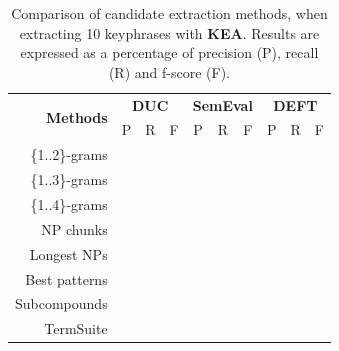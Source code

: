     \begin{table}[h]
      \centering
      \begin{tabular}{rccccccccc}
        \toprule
        \multirow{2}{*}[-2pt]{\textbf{Methods}} & \multicolumn{3}{c}{\textbf{DUC}} & \multicolumn{3}{c}{\textbf{SemEval}} & \multicolumn{3}{c}{\textbf{DEFT}}\\
        \cmidrule(r){2-4}\cmidrule(lr){5-7}\cmidrule(l){8-10}
        & P & R & F & P & R & F & P & R & F\\
        \midrule
        \{1..2\}-grams & & & & & & & & &\\
        \{1..3\}-grams & & & & & & & & &\\
        \{1..4\}-grams & & & & & & & & &\\
        NP chunks & & & & & & & & &\\
        Longest NPs & & & & & & & & &\\
        Best patterns & & & & & & & & &\\
        Subcompounds & & & & & & & & &\\
        TermSuite & & & & & & & & &\\
        \bottomrule
      \end{tabular}
      \caption{Comparison of candidate extraction methods, when extracting 10
               keyphrases with \textbf{KEA}. Results are expressed as a
               percentage of precision (P), recall (R) and f-score (F).
               \label{tab:keyphrase_extraction_results}}
    \end{table}

